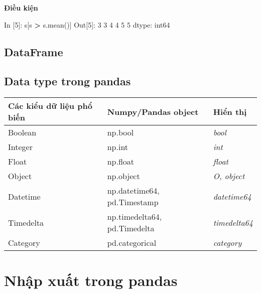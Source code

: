 \documentclass[
]{book}
\newenvironment{Shaded}{\begin{snugshade}}{\end{snugshade}}
\newcommand{\DecValTok}[1]{\textcolor[rgb]{0.00,0.00,0.81}{#1}}
\newcommand{\NormalTok}[1]{#1}
\newcommand{\OperatorTok}[1]{\textcolor[rgb]{0.81,0.36,0.00}{\textbf{#1}}}
\begin{document}
\textbf{Điều kiện}

\begin{Shaded}
\begin{Highlighting}[]
\NormalTok{In [}\DecValTok{5}\NormalTok{]: s[s }\OperatorTok{\textgreater{}}\NormalTok{ s.mean()]}
\NormalTok{Out[}\DecValTok{5}\NormalTok{]:}
\DecValTok{3}    \DecValTok{3}
\DecValTok{4}    \DecValTok{4}
\DecValTok{5}    \DecValTok{5}
\NormalTok{dtype: int64}
\end{Highlighting}
\end{Shaded}

\hypertarget{dataframe}{%
\section{DataFrame}\label{dataframe}}

\hypertarget{data-type-trong-pandas}{%
\section{Data type trong pandas}\label{data-type-trong-pandas}}

\begin{longtable}[]{@{}
  >{\raggedright\arraybackslash}p{}
  >{\raggedright\arraybackslash}p{}
  >{\raggedright\arraybackslash}p{}@{}}
\toprule
Các kiểu dữ liệu
phổ biến & Numpy/Pandas
object & Hiển thị \\
\midrule
\endhead
Boolean & np.bool & \emph{bool} \\
Integer & np.int & \emph{int} \\
Float & np.float & \emph{float} \\
Object & np.object & \emph{O, object} \\
Datetime & np.datetime64,
pd.Timestamp & \emph{datetime64} \\
Timedelta & np.timedelta64,
pd.Timedelta & \emph{timedelta64} \\
Category & pd.categorical & \emph{category} \\
\bottomrule
\end{longtable}

\hypertarget{nhux1eadp-xuux1ea5t-trong-pandas}{%
\chapter{Nhập xuất trong pandas}\label{nhux1eadp-xuux1ea5t-trong-pandas}}
\end{document}
